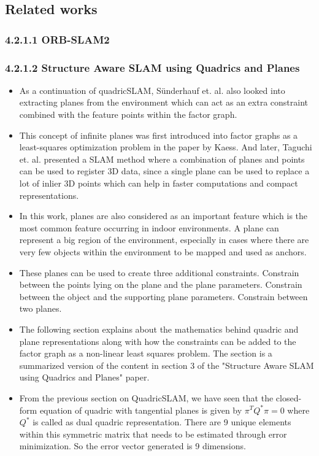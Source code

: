 \documentclass[report.tex]{subfiles}
\begin{document}
    \subsection{Related works}
    \subsubsection{4.2.1.1 ORB-SLAM2}
    \subsubsection{4.2.1.2 Structure Aware SLAM using Quadrics and Planes\cite{StructureAS}}
    \begin{itemize}
    \item As a continuation of quadricSLAM, Sünderhauf et. al. also looked into extracting planes from the environment which can act as an extra constraint combined with the feature points within the factor graph\cite{StructureAS}.
    \item This concept of infinite planes was first introduced into factor graphs as a least-squares optimization problem in the paper by Kaess\cite{infiniteplanes}. And later, Taguchi et. al. presented a SLAM method where a combination of planes and points can be used to register 3D data, since a single plane can be used to replace a lot of inlier 3D points which can help in faster computations and compact representations.\cite{infpla2}
    \item In this work, planes are also considered as an important feature which is the most common feature occurring in indoor environments. A plane can represent a big region of the environment, especially in cases where there are very few objects within the environment to be mapped and used as anchors.
    \item These planes can be used to create three additional constraints. Constrain between the points lying on the plane and the plane parameters. Constrain between the object and the supporting plane parameters. Constrain between two planes.
    \item The following section explains about the mathematics behind quadric and plane representations along with how the constraints can be added to the factor graph as a non-linear least squares problem. The section is a summarized version of the content in section 3 of the "Structure Aware SLAM using Quadrics and Planes" paper\cite{StructureAS}.
    \item From the previous section on QuadricSLAM, we have seen that the closed-form equation of quadric with tangential planes is given by $\pi^{T}Q^{*}\pi = 0$ where $Q^{*}$ is called as dual quadric representation. There are 9 unique elements within this symmetric matrix that needs to be estimated through error minimization. So the error vector generated is 9 dimensions.

\end{itemize}
\end{document}
